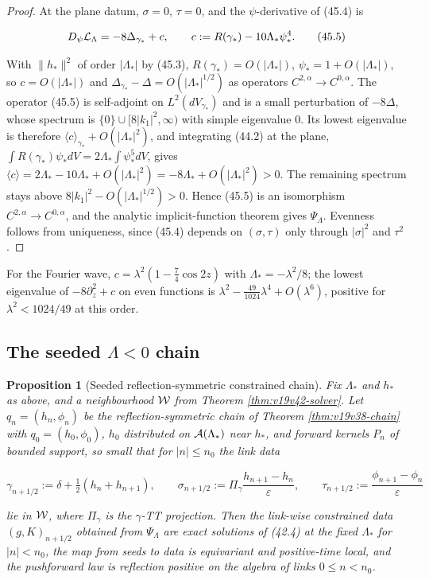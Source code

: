 \documentclass[11pt]{article}
\newtheorem{proposition}[theorem]{Proposition}
\theoremstyle{remark}
\begin{document}
\begin{proof}
At the plane datum, \(\sigma=0\), \(\tau=0\), and the
\(\psi\)-derivative of (45.4) is

\[
 D_\psi{\cal L}_\Lambda=-8\Delta_{\gamma_*}+c,\qquad
 c:=R(\gamma_*)-10\Lambda_*\psi_*^4.                                   \tag{45.5}
\]

With \(\|h_*\|^2\) of order \(|\Lambda_*|\) by (45.3),
\(R(\gamma_*)=O(|\Lambda_*|)\), \(\psi_*=1+O(|\Lambda_*|)\), so
\(c=O(|\Lambda_*|)\) and \(\Delta_{\gamma_*}-\Delta=O(|\Lambda_*|^{1/2})\)
as operators \(C^{2,\alpha}\to C^{0,\alpha}\).  The operator (45.5) is
self-adjoint on \(L^2(dV_{\gamma_*})\) and is a small perturbation of
\(-8\Delta\), whose spectrum is \(\{0\}\cup[8|k_1|^2,\infty)\) with
simple eigenvalue \(0\).  Its lowest eigenvalue is therefore
\(\langle c\rangle_{\gamma_*}+O(|\Lambda_*|^2)\), and integrating
(44.2) at the plane, \(\int R(\gamma_*)\psi_*dV=2\Lambda_*\int\psi_*^5dV\),
gives \(\langle c\rangle=2\Lambda_*-10\Lambda_*+O(|\Lambda_*|^2)=-8\Lambda_*+O(|\Lambda_*|^2)>0\).
The remaining spectrum stays above \(8|k_1|^2-O(|\Lambda_*|^{1/2})>0\).
Hence (45.5) is an isomorphism \(C^{2,\alpha}\to C^{0,\alpha}\), and the
analytic implicit-function theorem gives \(\Psi_\Lambda\).  Evenness
follows from uniqueness, since (45.4) depends on \((\sigma,\tau)\) only
through \(|\sigma|^2\) and \(\tau^2\).
\end{proof}

For the Fourier wave, \(c=\lambda^2(1-\tfrac74\cos2z)\) with
\(\Lambda_*=-\lambda^2/8\); the lowest eigenvalue of
\(-8\partial_z^2+c\) on even functions is
\(\lambda^2-\tfrac{49}{1024}\lambda^4+O(\lambda^6)\), positive for
\(\lambda^2<1024/49\) at this order.

\subsection{The seeded \(\Lambda<0\) chain}

\begin{proposition}[Seeded reflection-symmetric constrained chain]
\label{prop:v19v42-chain}
Fix \(\Lambda_*\) and \(h_*\) as above, and a neighbourhood
\({\cal W}\) from Theorem \ref{thm:v19v42-solver}.  Let \(q_n=(h_n,\phi_n)\)
be the reflection-symmetric chain of Theorem \ref{thm:v19v38-chain}
with \(q_0=(h_0,\phi_0)\), \(h_0\) distributed on \({\cal A}(\Lambda_*)\)
near \(h_*\), and forward kernels \(P_n\) of bounded support, so small
that for \(|n|\leq n_0\) the link data

\[
 \gamma_{n+1/2}:=\delta+\tfrac12(h_n+h_{n+1}),\qquad
 \sigma_{n+1/2}:=\Pi_{\gamma}\frac{h_{n+1}-h_n}{\varepsilon},\qquad
 \tau_{n+1/2}:=\frac{\phi_{n+1}-\phi_n}{\varepsilon}                    \tag{45.6}
\]

lie in \({\cal W}\), where \(\Pi_\gamma\) is the \(\gamma\)-TT
projection.  Then the link-wise constrained data
\((g,K)_{n+1/2}\) obtained from \(\Psi_\Lambda\) are exact solutions of
(42.4) at the fixed \(\Lambda_*\) for \(|n|<n_0\), the map from seeds to
data is equivariant and positive-time local, and the pushforward law is
reflection positive on the algebra of links \(0\leq n<n_0\).
\end{proposition}
\end{document}
